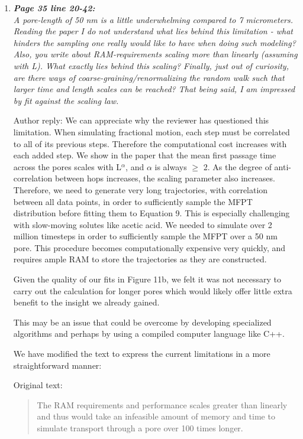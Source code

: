 \documentclass{article}
\begin{document}
\begin{enumerate}[label={Comment \theenumi :}, leftmargin=3.9\parindent]
  \item \textit{\textbf{Page 35 line 20-42:}\\
        A pore-length of 50 nm is a little underwhelming compared to 7 micrometers. Reading the paper
		I do not understand what lies behind this limitation - what hinders the sampling one really would
		like to have when doing such modeling? Also, you write about RAM-requirements scaling more
		than linearly (assuming with L). What exactly lies behind this scaling? Finally, just out of
		curiosity, are there ways of coarse-graining/renormalizing the random walk such that larger time
		and length scales can be reached? That being said, I am impressed by fit against the scaling
	  	law.}
	  	  
	  	Author reply: We can appreciate why the reviewer has questioned this limitation.
		When simulating fractional motion, each step must be correlated to all of its previous 
		steps. Therefore the computational cost increases with each added step. We show in the paper
		that the mean first passage time across the pores scales with L$^{\alpha}$, and $\alpha$ is
		always $\geq$ 2. As the degree of anti-correlation between hops increases, the scaling
		parameter also increases. Therefore, we need to generate very long trajectories, with 
		correlation between all data points, in order to sufficiently sample the MFPT distribution 
		before fitting them to Equation 9. This is especially challenging with slow-moving solutes
		like acetic acid. We needed to simulate over 2 million timesteps in order to sufficiently
		sample the MFPT over a 50 nm pore. This procedure becomes computationally expensive very
		quickly, and requires ample RAM to store the trajectories as they are constructed.
		
		Given the quality of our fits in Figure 11b, we felt it was not necessary to carry out the
		calculation for longer pores which would likely offer little extra benefit to the insight we
		already gained.
		 	
	  	This may be an issue that could be overcome by developing specialized algorithms and perhaps 
	  	by using a compiled computer language like C++. 
	  	
        We have modified the text to express the current limitations in a more straightforward manner:	  	
	  	
	  	Original text:
	  	\begin{quote}
	  	The RAM requirements and performance scales greater than linearly and thus would take an 
	  	infeasible amount of memory and time to simulate transport through a pore over 100 times
        longer. 
	  	\end{quote}
	  	

\end{enumerate}
\end{document}
